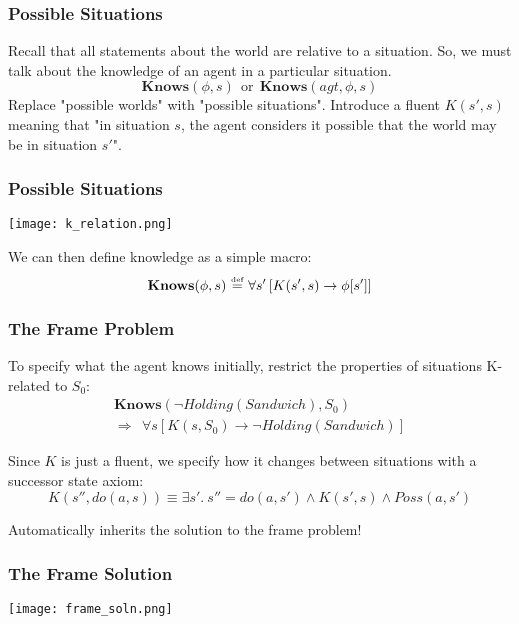 \documentclass{beamer}
\newcommand{\isdef}{\hbox{$\stackrel{\mbox{\tiny def}}{=}$}}
\begin{document}
\begin{frame}
\frametitle{Possible Situations}
Recall that all statements about the world are relative to a situation.
So, we must talk about the knowledge of an agent in a particular situation.
\begin{equation*}
\mathbf{Knows}(\phi,s)\ \ \mathrm{or}\ \ \mathbf{Knows}(agt,\phi,s)
\end{equation*}
\pause
Replace "possible worlds" with "possible situations".  Introduce a fluent
$K(s',s)$ meaning that "in situation $s$, the agent considers it possible
that the world may be in situation $s'$".
\end{frame}

\begin{frame}
\frametitle{Possible Situations}
\begin{center}
  \texttt{[image: k\_relation.png]}
\end{center}

We can then define knowledge as a simple macro:
\[ \mathbf{Knows}(\phi,s)\ \isdef\ \forall s'\left[K(s',s)\rightarrow \phi[s']\right] \]
\end{frame}

\begin{frame}
\frametitle{The Frame Problem}
To specify what the agent knows initially, restrict the properties of situations
K-related to $S_0$:
\begin{gather*}
  \mathbf{Knows}(\neg Holding(Sandwich),S_0) \\
  \Rightarrow \ \ \forall s \left[K(s,S_0) \rightarrow \neg Holding(Sandwich) \right]
\end{gather*}

\pause
Since $K$ is just a fluent, we specify how it changes  between situations
with a successor state axiom:
\begin{equation*}
 K(s'',do(a,s)) \equiv \exists s' . \ s''=do(a,s')
 \wedge K(s',s) \wedge Poss(a,s')
\end{equation*}

Automatically inherits the solution to the frame problem!
\end{frame}

\begin{frame}
\frametitle{The Frame Solution}
\begin{center}
  \texttt{[image: frame\_soln.png]}
\end{center}
\end{frame}
\end{document}

